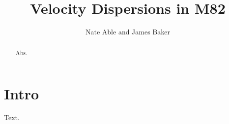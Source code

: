 \documentclass{emulateapj}
\begin{document}
\title{Velocity Dispersions in M82}
\author{Nate Able and James Baker}
\begin{abstract}
Abs.
\end{abstract}
\section{Intro}
Text.
\end{document}
